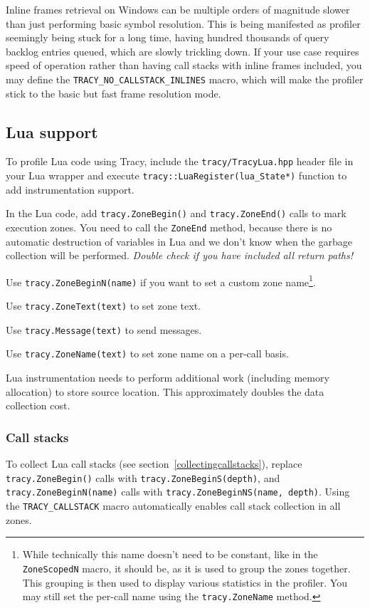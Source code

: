 \documentclass[hidelinks,titlepage,a4paper]{article}
\begin{document}
Inline frames retrieval on Windows can be multiple orders of magnitude slower than just performing basic symbol resolution. This is being manifested as profiler seemingly being stuck for a long time, having hundred thousands of query backlog entries queued, which are slowly trickling down. If your use case requires speed of operation rather than having call stacks with inline frames included, you may define the \texttt{TRACY\_NO\_CALLSTACK\_INLINES} macro, which will make the profiler stick to the basic but fast frame resolution mode.

\subsection{Lua support}

To profile Lua code using Tracy, include the \texttt{tracy/TracyLua.hpp} header file in your Lua wrapper and execute \texttt{tracy::LuaRegister(lua\_State*)} function to add instrumentation support.

In the Lua code, add \texttt{tracy.ZoneBegin()} and \texttt{tracy.ZoneEnd()} calls to mark execution zones. You need to call the \texttt{ZoneEnd} method, because there is no automatic destruction of variables in Lua and we don't know when the garbage collection will be performed. \emph{Double check if you have included all return paths!}

Use \texttt{tracy.ZoneBeginN(name)} if you want to set a custom zone name\footnote{While technically this name doesn't need to be constant, like in the \texttt{ZoneScopedN} macro, it should be, as it is used to group the zones together. This grouping is then used to display various statistics in the profiler. You may still set the per-call name using the \texttt{tracy.ZoneName} method.}.

Use \texttt{tracy.ZoneText(text)} to set zone text.

Use \texttt{tracy.Message(text)} to send messages.

Use \texttt{tracy.ZoneName(text)} to set zone name on a per-call basis.

Lua instrumentation needs to perform additional work (including memory allocation) to store source location. This approximately doubles the data collection cost.

\subsubsection{Call stacks}

To collect Lua call stacks (see section~\ref{collectingcallstacks}), replace \texttt{tracy.ZoneBegin()} calls with \texttt{tracy.ZoneBeginS(depth)}, and \texttt{tracy.ZoneBeginN(name)} calls with \texttt{tracy.ZoneBeginNS(name, depth)}. Using the \texttt{TRACY\_CALLSTACK} macro automatically enables call stack collection in all zones.
\end{document}
